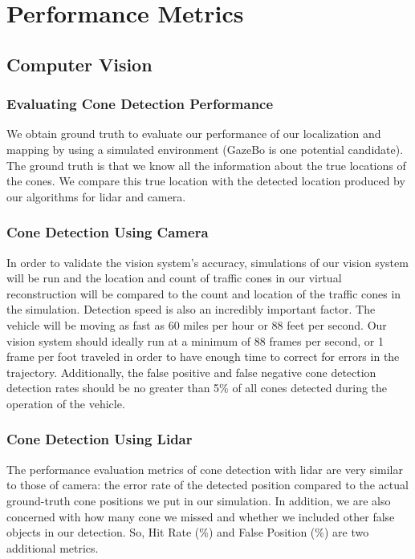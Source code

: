 \documentclass[10pt, onecolumn, draftclsnofoot, letterpaper,compsoc]{IEEEtran}
\begin{document}

\section{Performance Metrics}

\subsection{Computer Vision}

\subsubsection{Evaluating Cone Detection Performance}
We obtain ground truth to evaluate our performance of our localization and mapping by using a simulated environment (GazeBo is one potential candidate). The ground truth is that we know all the information about the true locations of the cones. We compare this true location with the detected location produced by our algorithms for lidar and camera. 

\subsubsection{Cone Detection Using Camera}
In order to validate the vision system’s accuracy, simulations of our vision system will be run and the location and count of traffic cones in our virtual reconstruction will be compared to the count and location of the traffic cones in the simulation. Detection speed is also an incredibly important factor. The vehicle will be moving as fast as 60 miles per hour or 88 feet per second. Our vision system should ideally run at a minimum of 88 frames per second, or 1 frame per foot traveled in order to have enough time to correct for errors in the trajectory. Additionally, the false positive and false negative cone detection detection rates should be no greater than 5\% of all cones detected during the operation of the vehicle.

\subsubsection{Cone Detection Using Lidar}

The performance evaluation metrics of cone detection with lidar are very similar to those of camera: the error rate of the detected position compared to the actual ground-truth cone positions we put in our simulation. In addition, we are also concerned with how many cone we missed and whether we included other false objects in our detection. So, Hit Rate (\%) and False Position (\%) are two additional metrics. 
\end{document}
